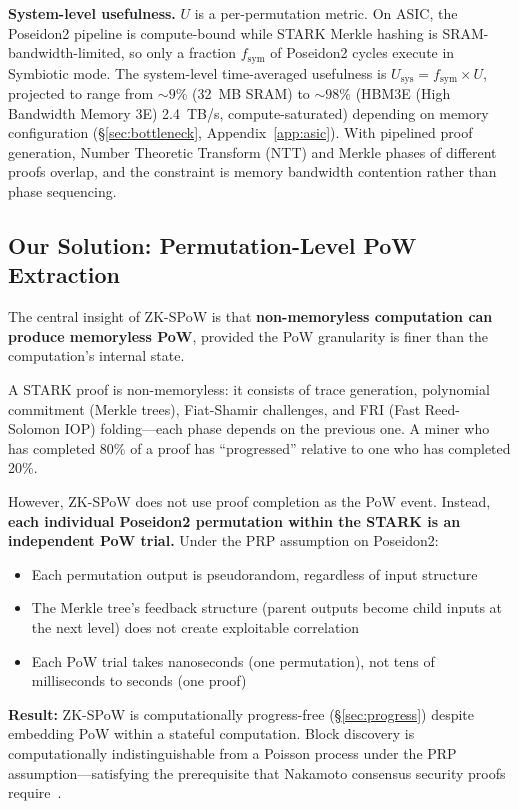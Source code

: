 \documentclass[11pt,a4paper]{article}
\begin{document}
\textbf{System-level usefulness.} $U$ is a per-permutation metric. On ASIC, the Poseidon2 pipeline is compute-bound while STARK Merkle hashing is SRAM-bandwidth-limited, so only a fraction $f_{\mathrm{sym}}$ of Poseidon2 cycles execute in Symbiotic mode. The system-level time-averaged usefulness is $U_{\mathrm{sys}} = f_{\mathrm{sym}} \times U$, projected to range from ${\sim}9\%$ (32~MB SRAM) to ${\sim}98\%$ (HBM3E (High Bandwidth Memory 3E) 2.4~TB/s, compute-saturated) depending on memory configuration (\S\ref{sec:bottleneck}, Appendix~\ref{app:asic}). With pipelined proof generation, Number Theoretic Transform (NTT) and Merkle phases of different proofs overlap, and the constraint is memory bandwidth contention rather than phase sequencing.

\subsection{Our Solution: Permutation-Level PoW Extraction}
\label{sec:extraction}

The central insight of ZK-SPoW is that \textbf{non-memoryless computation can produce memoryless PoW}, provided the PoW granularity is finer than the computation's internal state.

A STARK proof is non-memoryless: it consists of trace generation, polynomial commitment (Merkle trees), Fiat-Shamir challenges, and FRI (Fast Reed-Solomon IOP) folding---each phase depends on the previous one. A miner who has completed 80\% of a proof has ``progressed'' relative to one who has completed 20\%.

However, ZK-SPoW does not use proof completion as the PoW event. Instead, \textbf{each individual Poseidon2 permutation within the STARK is an independent PoW trial.} Under the PRP assumption on Poseidon2:

\begin{itemize}
\item Each permutation output is pseudorandom, regardless of input structure
\item The Merkle tree's feedback structure (parent outputs become child inputs at the next level) does not create exploitable correlation
\item Each PoW trial takes nanoseconds (one permutation), not tens of milliseconds to seconds (one proof)
\end{itemize}

\textbf{Result:} ZK-SPoW is computationally progress-free (\S\ref{sec:progress}) despite embedding PoW within a stateful computation. Block discovery is computationally indistinguishable from a Poisson process under the PRP assumption---satisfying the prerequisite that Nakamoto consensus security proofs require~\cite{dagknight,nakamoto}.
\end{document}
